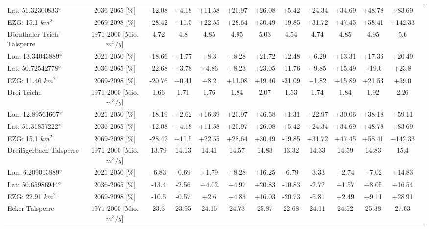 \begin{longtable}{@{\extracolsep{\fill}}lc|ccccc||cccccc}
Lat: 51.32300833° & 2036-2065 [\%]  & -12.08 & +4.18 & +11.58 & +20.97 & +26.08 & +5.42 & +24.34 & +34.69 & +48.78 & +83.69 & \\ 
EZG: 15.1 $km^2$ & 2069-2098 [\%]  & -28.42 & +11.5 & +22.55 & +28.64 & +30.49 & -19.85 & +31.72 & +47.45 & +58.41 & +142.33 & \\ 
\hline 
Dörnthaler Teich-Talsperre & 1971-2000 [Mio. $m^3/y$]  & 4.72 & 4.8 & 4.85 & 4.95 & 5.03 & 4.54 & 4.74 & 4.85 & 4.95 & 5.6 & \\ 
\cline{2-13} 
Lon: 13.34043889° & 2021-2050 [\%]  & -18.66 & +1.77 & +8.3 & +8.28 & +21.72 & -12.48 & +6.29 & +13.31 & +17.36 & +20.49 & \\ 
Lat: 50.72542778° & 2036-2065 [\%]  & -22.68 & +3.78 & +4.86 & +8.23 & +23.05 & -11.76 & +9.85 & +15.49 & +19.6 & +23.8 & \\ 
EZG: 11.46 $km^2$ & 2069-2098 [\%]  & -20.76 & +0.41 & +8.2 & +11.08 & +19.46 & -31.09 & +1.82 & +15.89 & +21.53 & +39.0 & \\ 
\hline 
Drei Teiche & 1971-2000 [Mio. $m^3/y$]  & 1.66 & 1.71 & 1.76 & 1.84 & 2.07 & 1.53 & 1.74 & 1.84 & 1.92 & 2.26 & \\ 
\cline{2-13} 
Lon: 12.89561667° & 2021-2050 [\%]  & -18.19 & +2.62 & +16.39 & +20.97 & +46.58 & +1.31 & +22.97 & +30.06 & +38.18 & +59.11 & \\ 
Lat: 51.31857222° & 2036-2065 [\%]  & -12.08 & +4.18 & +11.58 & +20.97 & +26.08 & +5.42 & +24.34 & +34.69 & +48.78 & +83.69 & \\ 
EZG: 15.1 $km^2$ & 2069-2098 [\%]  & -28.42 & +11.5 & +22.55 & +28.64 & +30.49 & -19.85 & +31.72 & +47.45 & +58.41 & +142.33 & \\ 
\hline 
Dreilägerbach-Talsperre & 1971-2000 [Mio. $m^3/y$]  & 13.79 & 14.13 & 14.41 & 14.57 & 14.83 & 13.32 & 14.33 & 14.59 & 14.83 & 15.4 & \\ 
\cline{2-13} 
Lon: 6.209013889° & 2021-2050 [\%]  & -6.83 & -0.69 & +1.79 & +8.28 & +16.25 & -6.79 & -3.33 & +2.74 & +7.02 & +14.83 & \\ 
Lat: 50.65986944° & 2036-2065 [\%]  & -13.4 & -2.56 & +4.02 & +4.97 & +20.83 & -10.83 & -2.72 & +1.57 & +8.05 & +16.54 & \\ 
EZG: 22.91 $km^2$ & 2069-2098 [\%]  & -10.5 & -0.57 & +2.6 & +4.83 & +16.03 & -20.73 & -5.81 & +2.49 & +9.11 & +28.91 & \\ 
\hline 
Ecker-Talsperre & 1971-2000 [Mio. $m^3/y$]  & 23.3 & 23.95 & 24.16 & 24.73 & 25.87 & 22.68 & 24.11 & 24.52 & 25.38 & 27.03 & \\ 
\cline{2-13} 

\end{longtable}
